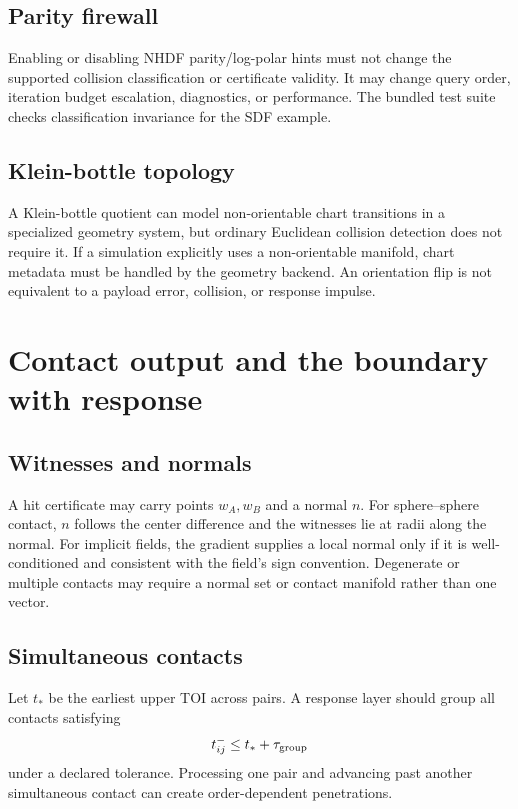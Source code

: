 \documentclass[11pt,a4paper,openany]{book}
\begin{document}
\section{Parity firewall}
\begin{decisionbox}
Enabling or disabling NHDF parity/log-polar hints must not change the supported collision classification or certificate validity. It may change query order, iteration budget escalation, diagnostics, or performance. The bundled test suite checks classification invariance for the SDF example.
\end{decisionbox}

\section{Klein-bottle topology}
A Klein-bottle quotient can model non-orientable chart transitions in a specialized geometry system, but ordinary Euclidean collision detection does not require it. If a simulation explicitly uses a non-orientable manifold, chart metadata must be handled by the geometry backend. An orientation flip is not equivalent to a payload error, collision, or response impulse.

\chapter{Contact output and the boundary with response}
\section{Witnesses and normals}
A hit certificate may carry points $w_A,w_B$ and a normal $n$. For sphere--sphere contact, $n$ follows the center difference and the witnesses lie at radii along the normal. For implicit fields, the gradient supplies a local normal only if it is well-conditioned and consistent with the field's sign convention. Degenerate or multiple contacts may require a normal set or contact manifold rather than one vector.

\section{Simultaneous contacts}
Let $t_*$ be the earliest upper TOI across pairs. A response layer should group all contacts satisfying
\begin{equation}
 t^-_{ij}\le t_*+\tau_{\rm group}
\end{equation}
under a declared tolerance. Processing one pair and advancing past another simultaneous contact can create order-dependent penetrations.
\end{document}
